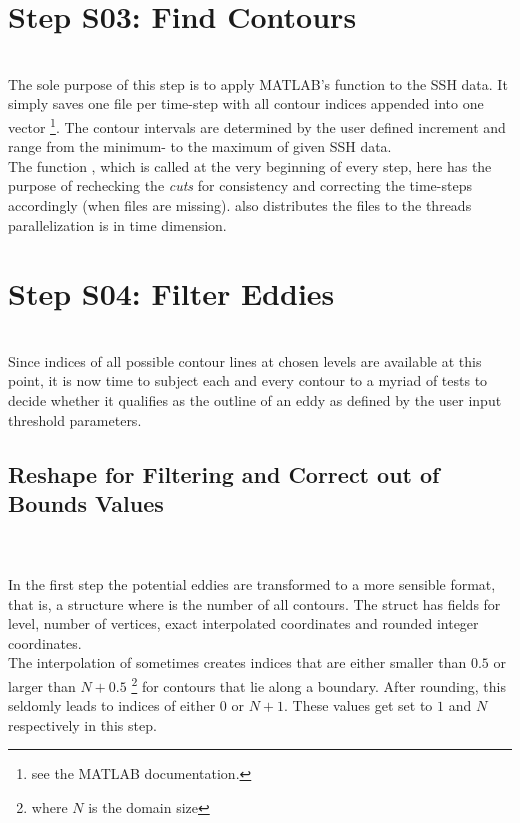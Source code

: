  \section{Step S03: Find Contours}
\\
The sole purpose of this step is to apply MATLAB's  function
to the SSH data. It simply saves one file per time-step with all contour indices
appended into one vector \footnote{see the MATLAB documentation.}. The contour
intervals are determined by the user defined increment and range from the
minimum- to the maximum of given SSH data. \\
The function , which is called at the very beginning of
every step, here has the purpose of rechecking the \textit{cuts} for
consistency and correcting the time-steps accordingly (\ie when files are
missing).  also distributes the files to the threads \ie
parallelization is in time dimension.
\section{Step S04: Filter Eddies} \label{S:04}
\\
Since indices of all possible contour lines at chosen levels are available at
this point, it is now time to subject each and every contour to a
myriad of tests to decide whether it qualifies as the outline of an eddy as
defined by the user input threshold parameters.
\subsection*{Reshape for Filtering and Correct out of Bounds Values}
\\
\\
In the first step the potential eddies are transformed to a more sensible
format, that is, a structure  where 
is the number of all contours. The struct has fields for level, number of
vertices, exact \ie interpolated coordinates and rounded integer coordinates.\\
The interpolation of  sometimes creates indices that are
either smaller than $0.5$ or larger than $N+0.5$ \footnote{where $N$ is the
domain size} for contours that lie along a boundary. After rounding, this
seldomly leads to indices of either $0$ or $N+1$. These values get set to $1$
and $N$ respectively in this step.
